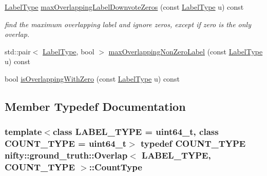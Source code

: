 \begin{DoxyCompactItemize}
\item 
\hyperlink{classnifty_1_1ground__truth_1_1Overlap_af14b9a872d3736d3115231866bc71612}{Label\+Type} \hyperlink{classnifty_1_1ground__truth_1_1Overlap_a6829df43d57809ad890da852e1c0fcdb}{max\+Overlapping\+Label\+Downvote\+Zeros} (const \hyperlink{classnifty_1_1ground__truth_1_1Overlap_af14b9a872d3736d3115231866bc71612}{Label\+Type} u) const 
\begin{DoxyCompactList}\small\item\em find the maximum overlapping label and ignore zeros, except if zero is the only overlap. \end{DoxyCompactList}\item 
std\+::pair$<$ \hyperlink{classnifty_1_1ground__truth_1_1Overlap_af14b9a872d3736d3115231866bc71612}{Label\+Type}, bool $>$ \hyperlink{classnifty_1_1ground__truth_1_1Overlap_ae62c3db2c94307a1a36c16603269cd20}{max\+Overlapping\+Non\+Zero\+Label} (const \hyperlink{classnifty_1_1ground__truth_1_1Overlap_af14b9a872d3736d3115231866bc71612}{Label\+Type} u) const 
\item 
bool \hyperlink{classnifty_1_1ground__truth_1_1Overlap_abb25bb8664462dd27ac19a56fe9b9e9c}{is\+Overlapping\+With\+Zero} (const \hyperlink{classnifty_1_1ground__truth_1_1Overlap_af14b9a872d3736d3115231866bc71612}{Label\+Type} u) const 
\end{DoxyCompactItemize}


\subsection{Member Typedef Documentation}
\hypertarget{classnifty_1_1ground__truth_1_1Overlap_ab8f82b8fef890dc3d7b69da0cc768c76}{}
\subsubsection[{Count\+Type}]{\setlength{\rightskip}{0pt plus 5cm}template$<$class L\+A\+B\+E\+L\+\_\+\+T\+Y\+P\+E  = uint64\+\_\+t, class C\+O\+U\+N\+T\+\_\+\+T\+Y\+P\+E  = uint64\+\_\+t$>$ typedef C\+O\+U\+N\+T\+\_\+\+T\+Y\+P\+E {\bf nifty\+::ground\+\_\+truth\+::\+Overlap}$<$ L\+A\+B\+E\+L\+\_\+\+T\+Y\+P\+E, C\+O\+U\+N\+T\+\_\+\+T\+Y\+P\+E $>$\+::{\bf Count\+Type}}\label{classnifty_1_1ground__truth_1_1Overlap_ab8f82b8fef890dc3d7b69da0cc768c76}
\hypertarget{classnifty_1_1ground__truth_1_1Overlap_af14b9a872d3736d3115231866bc71612}{}
